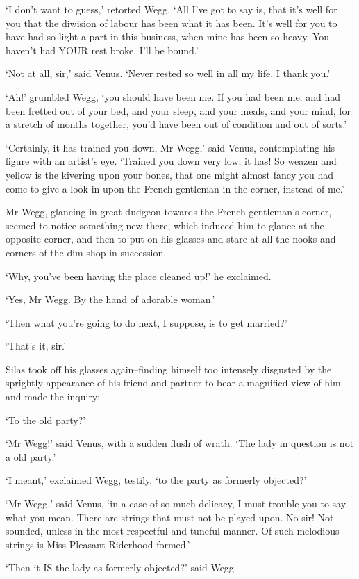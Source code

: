 ‘I don’t want to guess,’ retorted Wegg. ‘All I’ve got to say is, that
it’s well for you that the diwision of labour has been what it has been.
It’s well for you to have had so light a part in this business, when
mine has been so heavy. You haven’t had YOUR rest broke, I’ll be bound.’

‘Not at all, sir,’ said Venus. ‘Never rested so well in all my life, I
thank you.’

‘Ah!’ grumbled Wegg, ‘you should have been me. If you had been me, and
had been fretted out of your bed, and your sleep, and your meals, and
your mind, for a stretch of months together, you’d have been out of
condition and out of sorts.’

‘Certainly, it has trained you down, Mr Wegg,’ said Venus, contemplating
his figure with an artist’s eye. ‘Trained you down very low, it has! So
weazen and yellow is the kivering upon your bones, that one might almost
fancy you had come to give a look-in upon the French gentleman in the
corner, instead of me.’

Mr Wegg, glancing in great dudgeon towards the French gentleman’s
corner, seemed to notice something new there, which induced him to
glance at the opposite corner, and then to put on his glasses and stare
at all the nooks and corners of the dim shop in succession.

‘Why, you’ve been having the place cleaned up!’ he exclaimed.

‘Yes, Mr Wegg. By the hand of adorable woman.’

‘Then what you’re going to do next, I suppose, is to get married?’

‘That’s it, sir.’

Silas took off his glasses again--finding himself too intensely
disgusted by the sprightly appearance of his friend and partner to bear
a magnified view of him and made the inquiry:

‘To the old party?’

‘Mr Wegg!’ said Venus, with a sudden flush of wrath. ‘The lady in
question is not a old party.’

‘I meant,’ exclaimed Wegg, testily, ‘to the party as formerly objected?’

‘Mr Wegg,’ said Venus, ‘in a case of so much delicacy, I must trouble
you to say what you mean. There are strings that must not be played
upon. No sir! Not sounded, unless in the most respectful and tuneful
manner. Of such melodious strings is Miss Pleasant Riderhood formed.’

‘Then it IS the lady as formerly objected?’ said Wegg.

